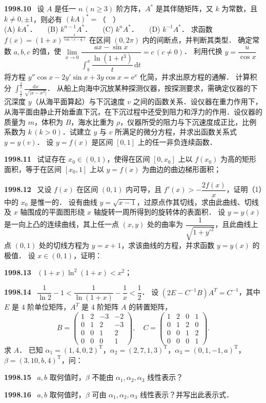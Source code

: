 \documentclass[UTF8,12pt]{ctexart}
\newcommand{\qn}[1]{\textbf{\large #1}\ }
\begin{document}
\vfill
\newpage
\qn{1998.10}
设 $A$ 是任一 $n\,(n\geqslant 3)$ 阶方阵，$A^*$ 是其伴随矩阵，又 $k$ 为常数，且 $k\neq 0,\pm 1$，则必有 $(kA)^*=$（　）
\\
\noindent (A) $kA^*$．　　(B) $k^{n-1}A^*$．　　(C) $k^nA^*$．　　(D) $k^{-1}A^*$．
求函数 $f(x)=(1+x)^{\frac{x}{\tan\left(x-\frac{\pi}{4}\right)}}$ 在区间 $(0,2\pi)$ 内的间断点，并判断其类型．
确定常数 $a,b,c$ 的值，使 $\lim\limits_{x\to 0}\dfrac{ax-\sin x}{\displaystyle\int_b^x\dfrac{\ln(1+t^3)}{t}\,\mathrm{d}t}=c\,(c\neq 0)$．
利用代换 $y=\dfrac{u}{\cos x}$ 将方程 $y''\cos x-2y'\sin x+3y\cos x=\mathrm{e}^x$ 化简，并求出原方程的通解．
计算积分 $\displaystyle\int_{\frac{1}{2}}^{\frac{3}{2}}\frac{\mathrm{d}x}{\sqrt{|x-x^2|}}$．
从船上向海中沉放某种探测仪器，按探测要求，需确定仪器的下沉深度 $y$（从海平面算起）与下沉速度 $v$ 之间的函数关系．设仪器在重力作用下，从海平面由静止开始垂直下沉，在下沉过程中还受到阻力和浮力的作用．设仪器的质量为 $m$，体积为 $B$，海水比重为 $\rho$，仪器所受的阻力与下沉速度成正比，比例系数为 $k\,(k>0)$．试建立 $y$ 与 $v$ 所满足的微分方程，并求出函数关系式 $y=y(v)$．
设 $y=f(x)$ 是区间 $[0,1]$ 上的任一非负连续函数．

\vfill
\newpage
\qn{1998.11}
试证存在 $x_0\in(0,1)$，使得在区间 $[0,x_0]$ 上以 $f(x_0)$ 为高的矩形面积，等于在区间 $[x_0,1]$ 上以 $y=f(x)$ 为曲边的曲边梯形面积；

\vfill
\newpage
\qn{1998.12}
又设 $f(x)$ 在区间 $(0,1)$ 内可导，且 $f'(x)>-\dfrac{2f(x)}{x}$，证明（1）中的 $x_0$ 是惟一的．
设有曲线 $y=\sqrt{x-1}$，过原点作其切线，求由此曲线、切线及 $x$ 轴围成的平面图形绕 $x$ 轴旋转一周所得到的旋转体的表面积．
设 $y=y(x)$ 是一向上凸的连续曲线，其上任一点 $(x,y)$ 处的曲率为 $\dfrac{1}{\sqrt{1+y'^2}}$，且此曲线上点 $(0,1)$ 处的切线方程为 $y=x+1$，求该曲线的方程，并求函数 $y=y(x)$ 的极值．
设 $x\in(0,1)$，证明：

\vfill
\newpage
\qn{1998.13}
$(1+x)\ln^2(1+x)<x^2$；

\vfill
\newpage
\qn{1998.14}
$\dfrac{1}{\ln 2}-1<\dfrac{1}{\ln(1+x)}-\dfrac{1}{x}<\dfrac{1}{2}$．
设 $(2E-C^{-1}B)A^T=C^{-1}$，其中 $E$ 是 $4$ 阶单位矩阵，$A^T$ 是 $4$ 阶矩阵 $A$ 的转置矩阵，
$$B=\begin{pmatrix} 1 & 2 & -3 & -2\\ 0 & 1 & 2 & -3\\ 0 & 0 & 1 & 2\\ 0 & 0 & 0 & 1 \end{pmatrix},\quad C=\begin{pmatrix} 1 & 2 & 0 & 1\\ 0 & 1 & 2 & 0\\ 0 & 0 & 1 & 2\\ 0 & 0 & 0 & 1 \end{pmatrix}.$$
求 $A$．
已知 $\alpha_1=(1,4,0,2)^{\mathrm{T}}$，$\alpha_2=(2,7,1,3)^{\mathrm{T}}$，$\alpha_3=(0,1,-1,a)^{\mathrm{T}}$，$\beta=(3,10,b,4)^{\mathrm{T}}$，问：

\vfill
\newpage
\qn{1998.15}
$a,b$ 取何值时，$\beta$ 不能由 $\alpha_1,\alpha_2,\alpha_3$ 线性表示？

\vfill
\newpage
\qn{1998.16}
$a,b$ 取何值时，$\beta$ 可由 $\alpha_1,\alpha_2,\alpha_3$ 线性表示？并写出此表示式．

\vfill
\newpage
\end{document}
